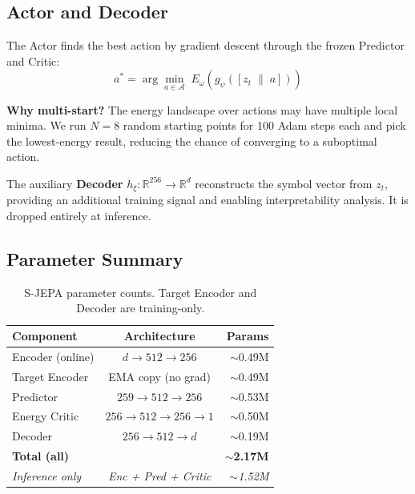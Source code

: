 \documentclass[10pt,twocolumn]{article}
\begin{document}
\subsection{Actor and Decoder}

The Actor finds the best action by gradient descent through the frozen Predictor and Critic:
\begin{equation}
a^* = \arg\min_{a \in \mathcal{A}} \; E_\omega\!\left(g_\psi\!\left([z_t \;\|\; a]\right)\right)
\label{eq:actor}
\end{equation}

\begin{conceptbox}
\textbf{Why multi-start?} The energy landscape over actions may have multiple local minima.
We run $N{=}8$ random starting points for 100 Adam steps each and pick the lowest-energy
result, reducing the chance of converging to a suboptimal action.
\end{conceptbox}

The auxiliary \textbf{Decoder} $h_\xi : \mathbb{R}^{256} \to \mathbb{R}^d$ reconstructs
the symbol vector from $z_t$, providing an additional training signal and enabling
interpretability analysis. It is dropped entirely at inference.

\subsection{Parameter Summary}

\begin{table}[h]
\centering
\small
\setlength{\tabcolsep}{4pt}
\begin{tabular}{lcr}
\toprule
Component & Architecture & Params \\
\midrule
Encoder (online) & $d \to 512 \to 256$ & $\sim$0.49M \\
Target Encoder   & EMA copy (no grad) & $\sim$0.49M \\
Predictor        & $259 \to 512 \to 256$ & $\sim$0.53M \\
Energy Critic    & $256 \to 512 \to 256 \to 1$ & $\sim$0.50M \\
Decoder          & $256 \to 512 \to d$ & $\sim$0.19M \\
\midrule
\textbf{Total (all)} & & \textbf{$\sim$2.17M} \\
\textit{Inference only} & \textit{Enc + Pred + Critic} & \textit{$\sim$1.52M} \\
\bottomrule
\end{tabular}
\caption{S-JEPA parameter counts. Target Encoder and Decoder are training-only.}
\label{tab:params}
\end{table}
\end{document}
